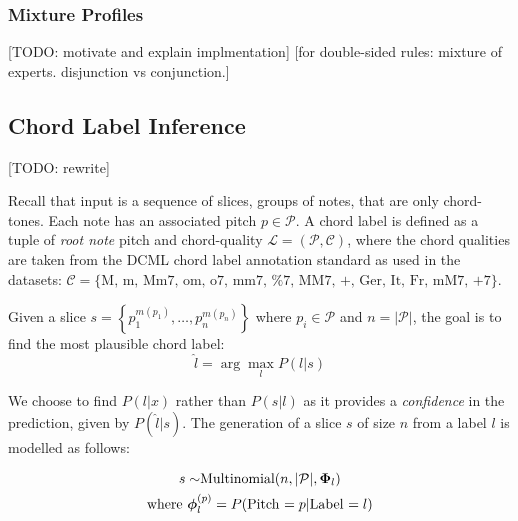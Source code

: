\documentclass[12pt,a4paper,twoside,openany]{report} \usepackage[pdfborder={0 0 0}]{hyperref}    %
\theoremstyle{definition} \newtheorem{definition}{Definition}[section]
\begin{document}
    \subsubsection{Mixture Profiles}
    [TODO: motivate and explain implmentation]
    [for double-sided rules: mixture of experts. disjunction vs conjunction.]

    \subsection{Chord Label Inference}
    [TODO: rewrite]

    Recall that input is a sequence of slices, groups of notes, that are only chord-tones. Each note has an associated
    pitch $p \in \mathcal{P}$. A chord label is defined as a tuple of \textit{root note} pitch and chord-quality
    $\mathcal{L} = (\mathcal{P}, \mathcal{C})$, where the chord qualities are taken from the DCML chord label annotation
    standard as used in the datasets: $\mathcal{C} = \{\text{M,~m, Mm7, om, o7, mm7, \%7, MM7, +, Ger, It, Fr, mM7,
    +7}\}$.

    Given a slice $s = \left\{ p_1^{m(p_1)} , \dots, p_n^{m(p_n)} \right\}$ where $p_i \in \mathcal{P}$ and $n
    = |\mathcal{P}|$, the goal is to find the most plausible chord label: \begin{equation} \hat{l} = \arg\max_l P(l|s)
  \end{equation}

    We choose to find $P(l|x)$ rather than $P(s|l)$ as it provides a \textit{confidence} in the prediction, given by
    $P(\hat{l}|s)$. The generation of a slice $s$ of size $n$ from a label $l$ is modelled as follows:

    \begin{equation} \begin{gathered}
        s \sim $Multinomial$(n, |\mathcal{P}|,\bm{\Phi}_l) \\ 
        $where $\bm{\phi}_{l}^{(p)} = P($Pitch $=p | $Label $=l) \\ 
      \end{gathered} \label{eq:sliceModel} \end{equation}
\end{document}
